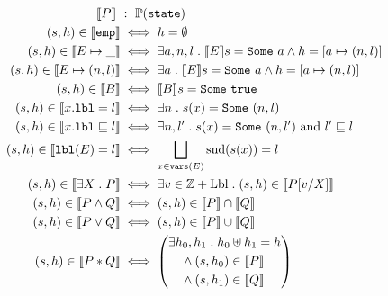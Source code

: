 \begin{figure}[!t]
\begin{align*}
\den{P} \,\, & : \,\, \pwrset{\ttt{state}} \\
(s,h) \in \den{\empa} & \iff h = \emptyset \\
(s,h) \in \den{E \mapsto \_} & \iff \exists a,n,l \such \den{E}s = \some{a} \land h = [a \mapsto (n,l)] \\
(s,h) \in \den{E \mapsto (n,l)} & \iff \exists a \such \den{E}s = \some{a} \land h = [a \mapsto (n,l)] \\
(s,h) \in \den{B} & \iff \den{B}s = \some{\true} \\
(s,h) \in \den{x.\ttt{lbl} = l} & \iff \exists n \such s(x) = \some{(n,l)} \\
(s,h) \in \den{x.\ttt{lbl} \sqsubseteq l} & \iff \exists n,l' \such s(x) = \some{(n,l')} \text{ and } l' \sqsubseteq l \\
(s,h) \in \den{\ttt{lbl}(E) = l} & \iff \bigsqcup_{x \in \ttt{vars}(E)} \text{snd}(s(x)) = l \\
(s,h) \in \den{\exists X \such P} & \iff \exists v \in \mathbb{Z} + \text{Lbl} \such (s,h) \in \den{P[v/X]} \\
(s,h) \in \den{P \land Q} & \iff (s,h) \in \den{P} \cap \den{Q} \\
(s,h) \in \den{P \lor Q} & \iff (s,h) \in \den{P} \cup \den{Q} \\
(s,h) \in \den{P*Q} & \iff
\left( \begin{aligned}
& \exists h_0, h_1 \such h_0 \uplus h_1 = h \\
& \quad \land (s,h_0) \in \den{P} \\
& \quad \land (s,h_1) \in \den{Q}
\end{aligned} \right)
\end{align*}


\end{figure}
